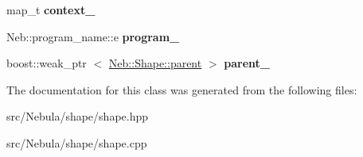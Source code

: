 \begin{DoxyCompactItemize}
\item 
\hypertarget{classNeb_1_1Shape_1_1shape_aaa83ac6a5dbb4f005389562fd04078a0}{map\-\_\-t {\bfseries context\-\_\-}}\label{classNeb_1_1Shape_1_1shape_aaa83ac6a5dbb4f005389562fd04078a0}

\item 
\hypertarget{classNeb_1_1Shape_1_1shape_adabbb91a4ab1a04ced1972fd64641864}{\-Neb\-::program\-\_\-name\-::e {\bfseries program\-\_\-}}\label{classNeb_1_1Shape_1_1shape_adabbb91a4ab1a04ced1972fd64641864}

\item 
\hypertarget{classNeb_1_1Shape_1_1shape_a039af70afef2476ca5df890c5fdcf8d3}{boost\-::weak\-\_\-ptr\*
$<$ \hyperlink{classNeb_1_1Shape_1_1parent}{\-Neb\-::\-Shape\-::parent} $>$ {\bfseries parent\-\_\-}}\label{classNeb_1_1Shape_1_1shape_a039af70afef2476ca5df890c5fdcf8d3}

\end{DoxyCompactItemize}


\-The documentation for this class was generated from the following files\-:\begin{DoxyCompactItemize}
\item 
src/\-Nebula/shape/shape.\-hpp\item 
src/\-Nebula/shape/shape.\-cpp\end{DoxyCompactItemize}
